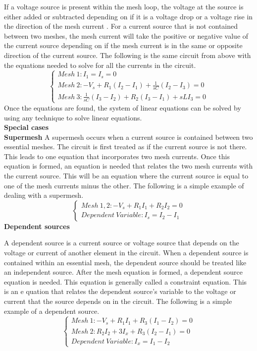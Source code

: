 \documentclass[letterpaper]{article}
\begin{document}
If a voltage source is present within the mesh loop, the voltage at the source is either added or 
subtracted depending on if it is a voltage drop or a voltage rise in the direction of the mesh current
. For a current source that is not contained between two meshes, the mesh current will take the positive 
or negative value of the current source depending on if the mesh current is in the same or opposite direction 
of the current source. The following is the same circuit from above with the equations needed to solve for 
all the currents in the circuit.
\[
    \begin{cases}
        Mesh\ 1:I_1=I_s=0\\
        Mesh\ 2:-V_s+R_1(I_2-I_1)+\frac{1}{sC}(I_2-I_3)=0\\
        Mesh\ 3:\frac{1}{sC}(I_3-I_2)+R_2(I_3-I_1)+sLI_3=0
    \end{cases}
    \]
Once the equations are found, the system of linear equations can be solved by using any technique to
solve linear equations.\\[1ex]
{\large\textbf{Special cases}}\\[2ex]
\textbf{Supermesh}
A supermesh occurs when a current source is contained between two essential meshes. The circuit is first treated as 
if the current source is not there. This leads to one equation that incorporates two mesh currents. Once 
this equation is formed, an equation is needed that relates the two mesh currents with the current source. 
This will be an equation where the current source is equal to one of the mesh currents minus the other. The 
following is a simple example of dealing with a supermesh.
\[
    \begin{cases}
        Mesh\ 1,2: -V_s+R_1I_1+R_2I_2=0\\
        Dependent\ Variable:I_s=I_2-I_1
    \end{cases}
    \]
\textbf{Dependent sources}

A dependent source is a current source or voltage source that depends on the voltage or current of another element 
in the circuit. When a dependent source is contained within an essential mesh, the dependent source should be 
treated like an independent source.
After the mesh equation is formed, a dependent source equation is needed. This equation is generally called a 
constraint equation. This is an e quation that relates the dependent source’s variable to the voltage or 
current that the source depends on in the circuit. The following is a simple example of a dependent source.
\[
    \begin{cases}
        Mesh\ 1: -V_s+R_1I_1+R_3(I_1-I_2)=0\\
        Mesh\ 2:R_2I_2+3I_x+R_3(I_2-I_1)=0\\
        Dependent\ Variable:I_x=I_1-I_2
    \end{cases}
    \]
\newpage
\end{document}
